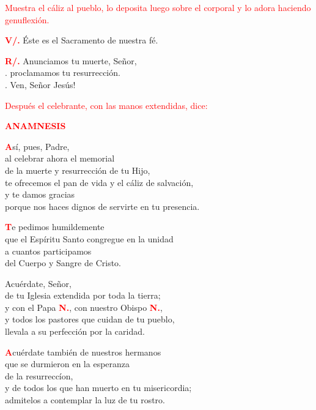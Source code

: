 \documentclass[12pt, letterpaper]{report}
\begin{document}
\large{\textcolor{red}{Muestra el c\'aliz al pueblo, lo deposita luego sobre el corporal y lo adora haciendo genuflexi\'on.}}

\noindent
\Large {\bfseries \textcolor{red}{V/.}} \hspace{0.5cm} \'Este es el Sacramento de nuestra f\'e.

\noindent
\Large {\bfseries \textcolor{red}{R/.}} \hspace{0.5cm} Anunciamos tu muerte, Se\~nor,\\
. \hspace{1.5cm} proclamamos tu resurrecci\'on.\\
. \hspace{1.5cm} Ven, Se\~nor Jes\'us!

\large{\textcolor{red}{Despu\'es el celebrante, con las manos extendidas, dice:}} 

\Large {\bfseries \textcolor{red}{ANAMNESIS}}

\lettrine[lines=1]{\bfseries \textcolor{red}{A}}{}\Large s\'i, pues, Padre,\\
al celebrar ahora el memorial\\
de la muerte y resurrecci\'on de tu Hijo,\\
te ofrecemos el pan de vida y el c\'aliz de salvaci\'on,\\
y te damos gracias\\
porque nos haces dignos de servirte en tu presencia.

\lettrine[lines=1]{\bfseries \textcolor{red}{T}}{}\Large e pedimos humildemente\\
que el Esp\'iritu Santo congregue en la unidad\\
a cuantos participamos\\
del Cuerpo y Sangre de Cristo.

\noindent
Acu\'erdate, Se\~nor,\\
de tu Iglesia extendida por toda la tierra; \\
y con el Papa {\bfseries \textcolor{red}{N.}}, con nuestro Obispo {\bfseries \textcolor{red}{N.}},\\
y todos los pastores que cuidan de tu pueblo,\\
llevala a su perfecci\'on por la caridad.

\lettrine[lines=1]{\bfseries \textcolor{red}{A}}{}\Large cu\'erdate tambi\'en de nuestros hermanos\\
que se durmieron en la esperanza\\
de la resurrecc\'ion,\\
y de todos los que han muerto en tu misericordia;\\
admitelos a contemplar la luz de tu rostro.
\end{document}
